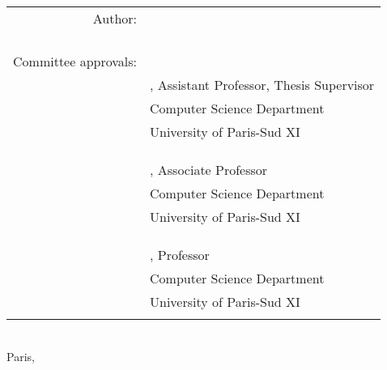 \begin{titlepage}
\begin{center}
\begin{tabular}{rl}
\\
Author: & \underline{\phantom{123456789012345678901234567890123456789012}}\\
    & \owner{}\\
    \\
    \\
    \\
Committee approvals: & \underline{\phantom{123456789012345678901234567890123456789012}}\\
    & \firstprof{}, Assistant Professor, Thesis Supervisor\\
    & {\small Computer Science Department}\\
    & {\small University of Paris-Sud XI}\\
    \vspace{0.2cm}
    \\
    \\
& \underline{\phantom{123456789012345678901234567890123456789012}}\\
    & \secondprof{}, Associate Professor\\
    & {\small Computer Science Department}\\
    & {\small University of Paris-Sud XI}\\
    \vspace{0.2cm}
    \\
    \\
& \underline{\phantom{123456789012345678901234567890123456789012}}\\
    & \thirdprof{}, Professor\\
    & {\small Computer Science Department}\\
    & {\small University of Paris-Sud XI}\\
    \vspace{0.2cm}

\end{tabular}
\\

\vfill
Paris, \thesisdate{}
\end{center}

\thispagestyle{empty}

\end{titlepage}
